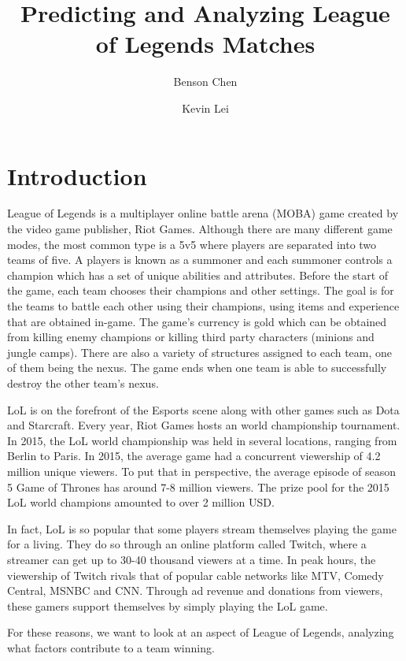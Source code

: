 \documentclass[runningheads]{llncs}
\begin{document}
  \title{Predicting and Analyzing League of Legends Matches}
  \author{Benson Chen \and Kevin Lei}
  \maketitle
  
  \section{Introduction}  

	League of Legends is a multiplayer online battle arena (MOBA) game created by the video game publisher, Riot Games. Although there are many different game modes, the most common type is a 5v5 where players are separated into two teams of five. A players is known as a summoner and each summoner controls a champion which has a set of unique abilities and attributes. Before the start of the game, each team chooses their champions and other settings. The goal is for the teams to battle each other using their champions, using items and experience that are obtained in-game. The game’s currency is gold which can be obtained from killing enemy champions or killing third party characters (minions and jungle camps). There are also a variety of structures assigned to each team, one of them being the nexus. The game ends when one team is able to successfully destroy the other team’s nexus.

	LoL is on the forefront of the Esports scene along with other games such as Dota and Starcraft. Every year, Riot Games hosts an world championship tournament. In 2015, the LoL world championship was held in several locations, ranging from Berlin to Paris. In 2015, the average game had a concurrent viewership of 4.2 million unique viewers. To put that in perspective, the average episode of season 5 Game of Thrones has around 7-8 million viewers. The prize pool for the 2015 LoL world champions amounted to over 2 million USD. 
	
	In fact, LoL is so popular that some players stream themselves playing the game for a living. They do so through an online platform called Twitch, where a streamer can get up to 30-40 thousand viewers at a time. In peak hours, the viewership of Twitch rivals that of popular cable networks like MTV, Comedy Central, MSNBC and CNN. Through ad revenue and donations from viewers, these gamers support themselves by simply playing the LoL game.

	For these reasons, we want to look at an aspect of League of Legends, analyzing what factors contribute to a team winning.
\end{document}
